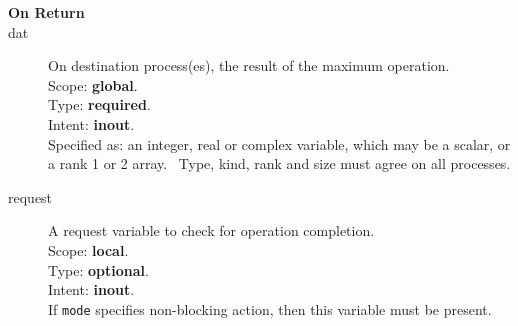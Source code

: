 \begin{description}
\item[\bf On Return]
\item[dat] On destination process(es), the result of the maximum operation.\\
Scope: {\bf global}.\\
Type: {\bf required}.\\
Intent: {\bf inout}.\\
Specified as: an integer, real or complex variable, which may be a
scalar, or a rank 1 or 2 array. \
Type, kind, rank and size must agree on all processes.
\item[request] A request variable to check for operation completion.\\
Scope: {\bf local}.\\
Type: {\bf optional}.\\
Intent: {\bf inout}.\\
If \verb|mode| specifies non-blocking action, then this
variable must be present.
\end{description}


